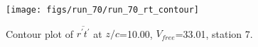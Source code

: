 \begin{figure}[H]
\centering
\texttt{[image: figs/run\_70/run\_70\_rt\_contour]}
\caption{Contour plot of $\overline{r^\prime t^\prime}$ at $z/c$=10.00, $V_{free}$=33.01, station 7.}
\end{figure}


